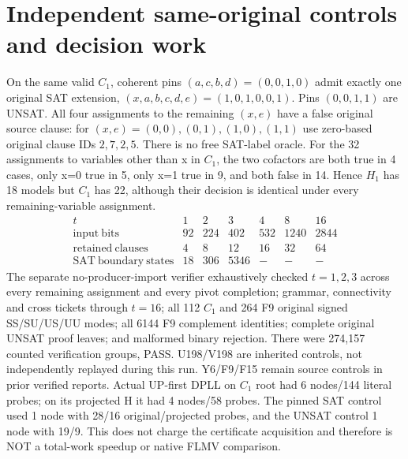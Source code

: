 \documentclass[11pt]{article}
\begin{document}
\section{Independent same-original controls and decision work}
On the same valid $C_1$, coherent pins $(a,c,b,d)=(0,0,1,0)$ admit exactly one original SAT extension, $(x,a,b,c,d,e)=(1,0,1,0,0,1)$. Pins $(0,0,1,1)$ are UNSAT. All four assignments to the remaining $(x,e)$ have a false original source clause: for $(x,e)=(0,0),(0,1),(1,0),(1,1)$ use zero-based original clause IDs $2,7,2,5$. There is no free SAT-label oracle.
For the 32 assignments to variables other than x in $C_1$, the two cofactors are both true in 4 cases, only x=0 true in 5, only x=1 true in 9, and both false in 14. Hence $H_1$ has 18 models but $C_1$ has 22, although their decision is identical under every remaining-variable assignment.
\[
\begin{array}{r|rrrrrr}
t&1&2&3&4&8&16\\\hline
\mathrm{input\ bits}&92&224&402&532&1240&2844\\
\mathrm{retained\ clauses}&4&8&12&16&32&64\\
\mathrm{SAT\ boundary\ states}&18&306&5346&-&-&-
\end{array}
\]
The separate no-producer-import verifier exhaustively checked $t=1,2,3$ across every remaining assignment and every pivot completion; grammar, connectivity and cross tickets through $t=16$; all 112 $C_1$ and 264 F9 original signed SS/SU/US/UU modes; all 6144 F9 complement identities; complete original UNSAT proof leaves; and malformed binary rejection. There were 274,157 counted verification groups, PASS. U198/V198 are inherited controls, not independently replayed during this run. Y6/F9/F15 remain source controls in prior verified reports.
Actual UP-first DPLL on $C_1$ root had 6 nodes/144 literal probes; on its projected H it had 4 nodes/58 probes. The pinned SAT control used 1 node with 28/16 original/projected probes, and the UNSAT control 1 node with 19/9. This does not charge the certificate acquisition and therefore is NOT a total-work speedup or native FLMV comparison.
\end{document}
